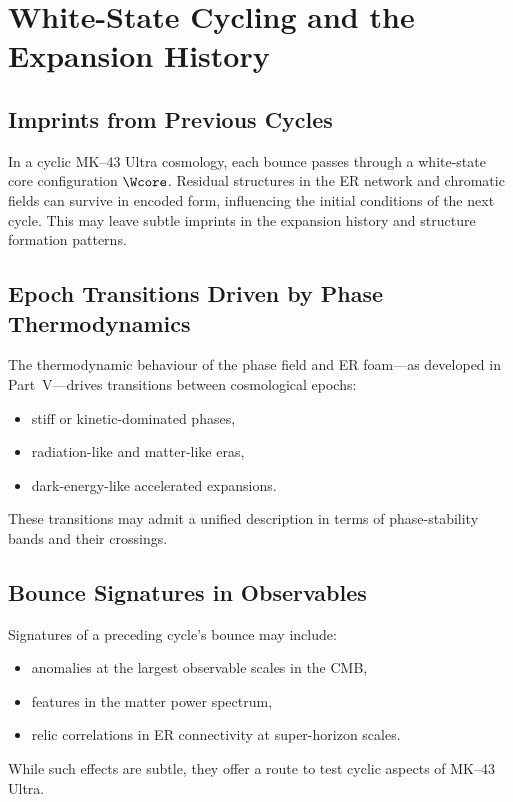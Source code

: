 \chapter{White-State Cycling and the Expansion History}

\section{Imprints from Previous Cycles}

In a cyclic MK--43 Ultra cosmology, each bounce passes through a white-state core configuration $\Wcore$.
Residual structures in the ER network and chromatic fields can survive in encoded form, influencing the initial conditions of the next cycle.
This may leave subtle imprints in the expansion history and structure formation patterns.

\section{Epoch Transitions Driven by Phase Thermodynamics}

The thermodynamic behaviour of the phase field and ER foam---as developed in Part~V---drives transitions between cosmological epochs:
\begin{itemize}
  \item stiff or kinetic-dominated phases,
  \item radiation-like and matter-like eras,
  \item dark-energy-like accelerated expansions.
\end{itemize}
These transitions may admit a unified description in terms of phase-stability bands and their crossings.

\section{Bounce Signatures in Observables}

Signatures of a preceding cycle's bounce may include:
\begin{itemize}
  \item anomalies at the largest observable scales in the CMB,
  \item features in the matter power spectrum,
  \item relic correlations in ER connectivity at super-horizon scales.
\end{itemize}
While such effects are subtle, they offer a route to test cyclic aspects of MK--43 Ultra.

